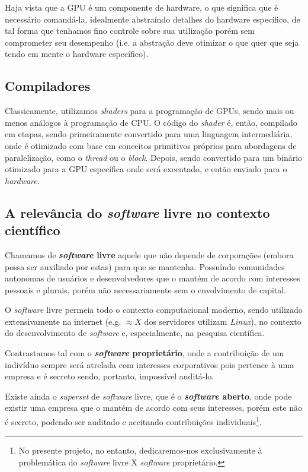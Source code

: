 \documentclass[10pt, conference]{IEEEtran}
\begin{document}
Haja vista que a GPU é um componente de hardware, o que significa que é
necessário comandá-la, idealmente abstraíndo detalhes do hardware específico,
de tal forma que tenhamos fino controle sobre sua utilização porém sem
comprometer seu desempenho (i.e. a abstração deve otimizar o que quer que seja
tendo em mente o hardware específico).

\subsection{Compiladores}

Classicamente, utilizamos \textit{shaders} para a programação de GPUs, sendo
mais ou menos análogos à programação de CPU. O código do \textit{shader} é,
então, compilado em etapas, sendo primeiramente convertido para uma linguagem
intermediária, onde é otimizado com base em conceitos primitivos próprios para
abordagens de paralelização, como o \textit{thread} ou o \textit{block}.
Depois, sendo convertido para um binário otimizado para a GPU específica onde
será executado, e então enviado para o \textit{hardware}.

\subsection{A relevância do \textit{software} livre no contexto científico}

Chamamos de \textbf{\textit{software} livre} aquele que não depende de
corporações (embora possa ser auxiliado por estas) para que se mantenha.
Possuíndo comunidades autonomas de usuários e desenvolvedores que o mantém
de acordo com interesses pessoais e plurais, porém não necessariamente sem
o envolvimento de capital.

O \textit{software} livre permeia todo o contexto computacional moderno,
sendo utilizado extensivamente na internet (e.g. $\approx X$ dos
servidores utilizam \textit{Linux}), no contexto do desenvolvimento de
\textit{software} e, especialmente, na pesquisa científica.

Contrastamos tal com o \textbf{\textit{software} proprietário}, onde a
contribuição de um indivíduo sempre será atrelada com interesses corporativos
pois pertence à uma empresa e é secreto sendo, portanto, impossível auditá-lo.

Existe ainda o \textit{superset} de \textit{software} livre, que é o
\textbf{\textit{software} aberto}, onde pode existir uma empresa que o mantém
de acordo com seus interesses, porém este não é secreto, podendo ser auditado
e aceitando contribuições individuais\footnote{
    No presente projeto, no entanto, dedicaremos-nos exclusivamente à
    problemática do \textit{software} livre X \textit{software} proprietário.
}.
\end{document}
